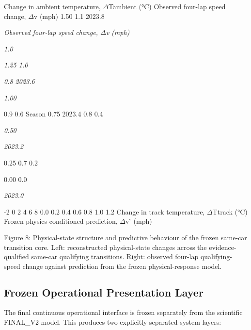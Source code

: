 Change in ambient temperature, \ensuremath{\Delta}Tambient (°C) Observed four-lap speed change, \ensuremath{\Delta}v (mph) 1.50 1.1 2023.8

\begin{center}\textit{Observed four-lap speed change, \ensuremath{\Delta}v (mph)}\end{center}

\begin{center}\textit{1.0}\end{center}

\begin{center}\textit{1.25                                                             1.0}\end{center}

\begin{center}\textit{0.8                                                                    2023.6}\end{center}

\begin{center}\textit{1.00}\end{center}

0.9 0.6 Season 0.75 2023.4 0.8 0.4

\begin{center}\textit{0.50}\end{center}

\begin{center}\textit{2023.2}\end{center}

0.25 0.7 0.2

0.00 0.0

\begin{center}\textit{2023.0}\end{center}

-2 0 2 4 6 8 0.0 0.2 0.4 0.6 0.8 1.0 1.2 Change in track temperature, \ensuremath{\Delta}Ttrack (°C) Frozen physics-conditioned prediction, \ensuremath{\Delta}v ̂ (mph)

Figure 8: Physical-state structure and predictive behaviour of the frozen same-car transition core. Left: reconstructed physical-state changes across the evidence-qualified same-car qualifying transitions. Right: observed four-lap qualifying-speed change against prediction from the frozen physical-response model.

\subsection{Frozen Operational Presentation Layer}
The final continuous operational interface is frozen separately from the scientific FINAL\_V2 model. This produces two explicitly separated system layers:

